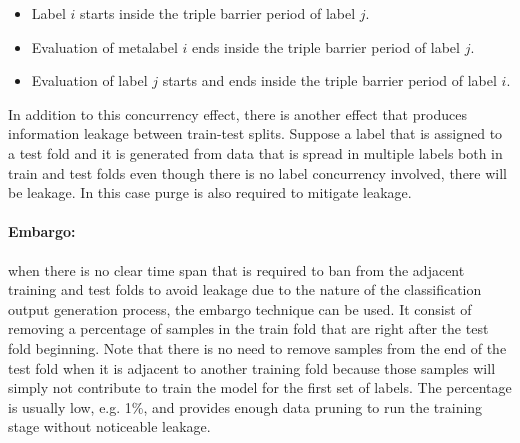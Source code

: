 \begin{itemize}
  \item Label $i$ starts inside the triple barrier period of label $j$.
  \item Evaluation of metalabel $i$ ends inside the triple barrier period of
        label $j$.
  \item Evaluation of label $j$ starts and ends inside the triple barrier period
        of label $i$.
\end{itemize}

In addition to this concurrency effect, there is another effect that produces
information leakage between train-test splits. Suppose a label that is assigned
to a test fold and it is generated from data that is spread in multiple
labels both in train and test folds even though there is no label concurrency
involved, there will be leakage. In this case purge is also required to mitigate
leakage.


\paragraph{Embargo:} when there is no clear time span that is required to ban
from the adjacent training and test folds to avoid leakage due to the nature of
the classification output generation process, the embargo technique can be used.
It consist of removing a percentage of samples in the train fold that are right
after the test fold beginning. Note that there is no need to remove samples from
the end of the test fold when it is adjacent to another training fold because
those samples will simply not contribute to train the model for the first set
of labels. The percentage is usually low, e.g. 1\%, and provides enough data
pruning to run the training stage without noticeable leakage.
